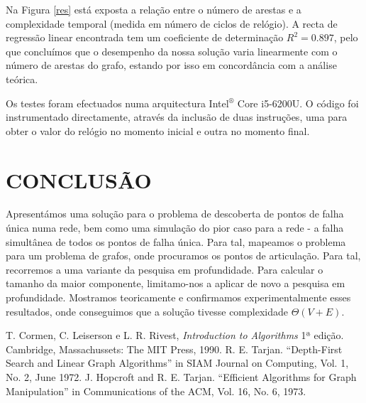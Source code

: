 \documentclass[a4paper, 12pt, conference, portuguese]{ieeeconf}
\begin{document}
Na Figura \ref{res} está exposta a relação entre o número de arestas e a
complexidade temporal (medida em número de ciclos de relógio). A recta de
regressão linear encontrada tem um coeficiente de determinação $R^2 = 0.897$,
pelo que concluímos que o desempenho da nossa solução varia linearmente com o
número de arestas do grafo, estando por isso em concordância com a análise
teórica.

Os testes foram efectuados numa arquitectura Intel$^\circledR$ Core\texttrademark
i5-6200U. O código foi instrumentado directamente, através da inclusão de duas
instruções, uma para obter o valor do relógio no momento inicial e outra no
momento final.

\section{CONCLUSÃO}\label{conclusion}

Apresentámos uma solução para o problema de descoberta de pontos de falha única
numa rede, bem como uma simulação do pior caso para a rede - a falha simultânea de
todos os pontos de falha única. Para tal, mapeamos o problema para um problema
de grafos, onde procuramos os pontos de articulação. Para tal, recorremos a uma variante da
pesquisa em profundidade. Para calcular o tamanho da maior componente,
limitamo-nos a aplicar de novo a pesquisa em profundidade. Mostramos
teoricamente e confirmamos experimentalmente esses resultados, onde conseguimos
que a solução tivesse complexidade $\Theta(V + E)$.

\begin{thebibliography}{99}
   T. Cormen, C. Leiserson e L. R. Rivest, \textit{Introduction
    to Algorithms} 1ª edição. Cambridge, Massachussets: The MIT Press,
    1990.
   R. E. Tarjan. ``Depth-First Search and Linear Graph
    Algorithms'' in SIAM Journal on Computing, Vol. 1, No. 2, June 1972.
   J. Hopcroft and R. E. Tarjan. ``Efficient Algorithms for
    Graph Manipulation'' in Communications of the ACM, Vol. 16, No. 6, 1973.
\end{thebibliography}
\end{document}
